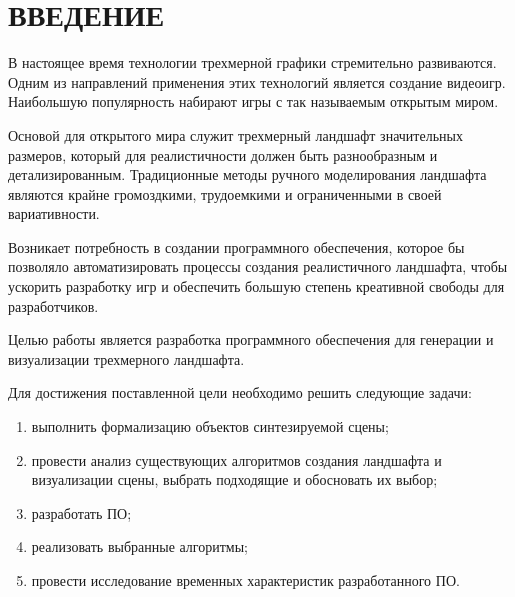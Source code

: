 
\chapter*{ВВЕДЕНИЕ}


В настоящее время технологии трехмерной графики стремительно развиваются.
Одним из направлений применения этих технологий является создание видеоигр.
Наибольшую популярность набирают игры с так называемым открытым миром.

Основой для открытого мира служит трехмерный ландшафт значительных размеров, который для реалистичности должен быть разнообразным и детализированным.
Традиционные методы ручного моделирования ландшафта являются крайне громоздкими, трудоемкими и ограниченными в своей вариативности. 

Возникает потребность в создании программного обеспечения, которое бы позволяло автоматизировать процессы создания реалистичного ландшафта, чтобы ускорить разработку игр и обеспечить большую степень креативной свободы для разработчиков.

Целью работы является разработка программного обеспечения для генерации и визуализации трехмерного ландшафта.


Для достижения поставленной цели необходимо решить следующие задачи: 

\begin{enumerate}[label={\arabic*)}]
	\item выполнить формализацию объектов синтезируемой сцены;
	\item провести анализ существующих алгоритмов создания ландшафта и визуализации сцены, выбрать подходящие и обосновать их выбор;
	\item разработать ПО;
	\item реализовать выбранные алгоритмы;
	\item провести исследование временных характеристик разработанного ПО.
\end{enumerate}

